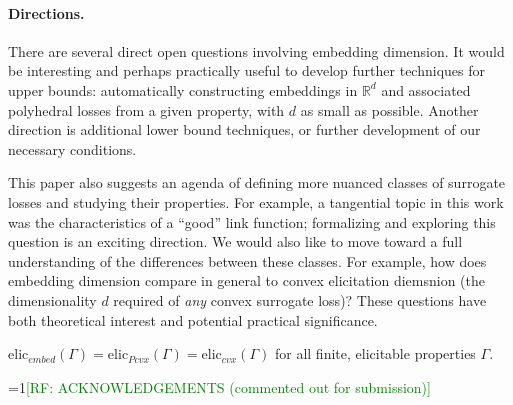 \documentclass[anon,12pt]{colt2019}
\newcommand{\Comments}{1}
\newcommand{\mynote}[2]{\ifnum\Comments=1\textcolor{#1}{#2}\fi}
\newcommand{\raf}[1]{\mynote{green}{[RF: #1]}}
\newcommand{\reals}{\mathbb{R}}
\begin{document}
\paragraph{Directions.}
There are several direct open questions involving embedding dimension.
It would be interesting and perhaps practically useful to develop further techniques for upper bounds: automatically constructing embeddings in $\reals^d$ and associated polyhedral losses from a given property, with $d$ as small as possible.
Another direction is additional lower bound techniques, or further development of our necessary conditions.

This paper also suggests an agenda of defining more nuanced classes of surrogate losses and studying their properties.
For example, a tangential topic in this work was the characteristics of a ``good'' link function; formalizing and exploring this question is an exciting direction.
We would also like to move toward a full understanding of the differences between these classes.
For example, how does embedding dimension compare in general to convex elicitation diemsnion (the dimensionality $d$ required of \emph{any} convex surrogate loss)?
These questions have both theoretical interest and potential practical significance.

\begin{conjecture}
  $\mathrm{elic}_{embed}(\Gamma) = \mathrm{elic}_{Pcvx}(\Gamma) = \mathrm{elic}_{cvx}(\Gamma)$ for all finite, elicitable properties $\Gamma$.
\end{conjecture}


\raf{ACKNOWLEDGEMENTS (commented out for submission)}



\appendix
\end{document}
